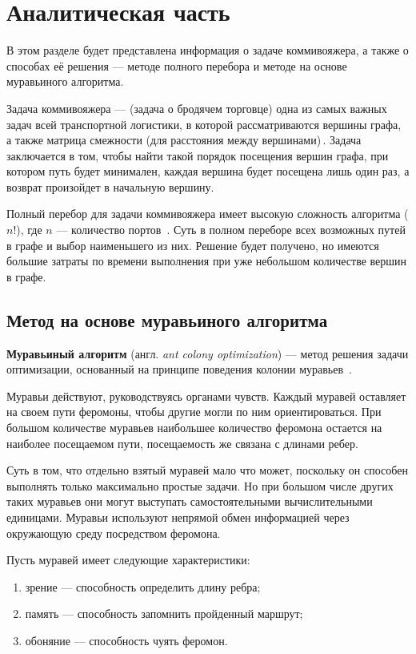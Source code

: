 \chapter{Аналитическая часть}
В этом разделе будет представлена информация о задаче коммивояжера,
а также о способах её решения — методе полного перебора и методе на основе муравьиного алгоритма.

Задача коммивояжера  --- (задача о бродячем торговце) одна из самых важных задач всей транспортной логистики, в которой рассматриваются вершины графа, а также матрица смежности (для расстояния между вершинами)\,\cite{task}.
Задача заключается в том, чтобы найти такой порядок посещения вершин графа, при котором путь будет минимален, каждая вершина будет посещена лишь один раз, а возврат произойдет в начальную вершину.

Полный перебор для задачи коммивояжера имеет высокую сложность алгоритма ($n!$), где $n$ --- количество портов~\cite{full-comb}.
Суть в полном переборе всех возможных путей в графе и выбор наименьшего из них.
Решение будет получено, но имеются большие затраты по времени выполнения при уже небольшом количестве вершин в графе.

\section{Метод на основе муравьиного алгоритма}

\textbf{Муравьиный алгоритм} (англ. \textit{ant colony optimization}) --- метод решения задачи оптимизации, основанный на принципе поведения колонии муравьев~\cite{full-comb}.

Муравьи действуют, руководствуясь органами чувств.
Каждый муравей оставляет на своем пути феромоны, чтобы другие могли по ним ориентироваться.
При большом количестве муравьев наибольшее количество феромона остается на наиболее посещаемом пути, посещаемость же связана с длинами ребер.

Суть в том, что отдельно взятый муравей мало что может, поскольку он способен выполнять только максимально простые задачи. Но при большом числе других таких муравьев они могут выступать самостоятельными вычислительными единицами. Муравьи используют непрямой обмен информацией через окружающую среду посредством феромона.

Пусть муравей имеет следующие характеристики:
\begin{enumerate}
	\item зрение --- способность определить длину ребра;
	\item память --- способность запомнить пройденный маршрут;
	\item обоняние --- способность чуять феромон.
\end{enumerate}



